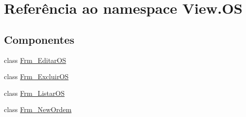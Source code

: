 \hypertarget{namespace_view_1_1_o_s}{}\section{Referência ao namespace View.\+O\+S}
\label{namespace_view_1_1_o_s}
\subsection*{Componentes}
\begin{DoxyCompactItemize}
\item 
class \hyperlink{class_view_1_1_o_s_1_1_frm___editar_o_s}{Frm\+\_\+\+Editar\+O\+S}
\item 
class \hyperlink{class_view_1_1_o_s_1_1_frm___excluir_o_s}{Frm\+\_\+\+Excluir\+O\+S}
\item 
class \hyperlink{class_view_1_1_o_s_1_1_frm___listar_o_s}{Frm\+\_\+\+Listar\+O\+S}
\item 
class \hyperlink{class_view_1_1_o_s_1_1_frm___new_ordem}{Frm\+\_\+\+New\+Ordem}
\end{DoxyCompactItemize}
